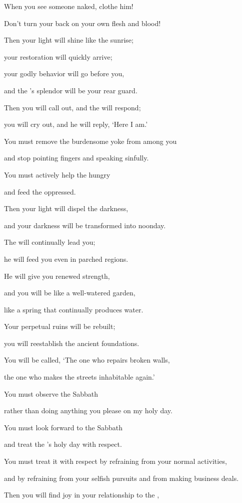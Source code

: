 {\par }{\Q When you see
someone naked,
clothe
him!
\par }{\Q Don’t
turn
your back
on your own flesh and blood!
\par }{\Q {}Then
your light
will shine
like the sunrise;
\par }{\Q your restoration
will quickly
arrive;
\par }{\Q your godly
behavior will go
before
you,
\par }{\Q and the
{}’s
splendor
will be your rear guard.
\par }{\Q {}Then
you will call
out, and the
{}
will respond;
\par }{\Q you will cry out,
and he will reply,
‘Here I am.’
\par }{\Q You must
remove
the burdensome yoke
from among
you
\par }{\Q and stop pointing
fingers
and speaking
sinfully.
\par }{\Q {}You must actively
help the hungry
\par }{\Q and feed the oppressed.
\par }{\Q Then your
light
will dispel
the darkness,
\par }{\Q and your darkness will be transformed
into noonday.
\par }{\Q {}The
{}
will continually
lead
you;
\par }{\Q he will feed
you even in parched regions.
\par }{\Q He will give
you renewed strength,
\par }{\Q and you will be
like a well-watered
garden,
\par }{\Q like a spring
that
continually produces water.
\par }{\Q {}Your perpetual
ruins
will be rebuilt;
\par }{\Q you will reestablish
the ancient
foundations.
\par }{\Q You will be called,
‘The one
who
repairs broken walls,
\par }{\Q the one
who makes the streets inhabitable again.’
\par }{\Q {}You must
observe
the Sabbath
\par }{\Q rather than doing
anything you please
on my holy
day.
\par }{\Q You must look forward
to the Sabbath
\par }{\Q and treat the
{}’s
holy day
with respect.
\par }{\Q You must treat it with respect
by refraining
from your normal activities,
\par }{\Q and by refraining
from your selfish pursuits
and from making
business deals.
\par }{\Q {}Then
you will find joy
in
your relationship to the
{},

}
